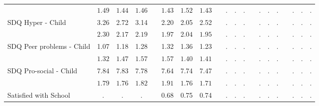 \begin{center}
{\begin{longtable}{L{5cm} c c c p{.5cm} c c c p{.5cm} c c c p{.5cm} c c c p{.5cm} c c c}
& $\mathit{     1.49}$ & $\mathit{     1.44}$ & $\mathit{     1.46}$ & & $\mathit{     1.43}$ & $\mathit{     1.52}$ & $\mathit{     1.43}$ & & $\mathit{        .}$ & $\mathit{        .}$ & $\mathit{        .}$ & & $\mathit{        .}$ & $\mathit{        .}$ & $\mathit{        .}$ & & $\mathit{        .}$ & $\mathit{        .}$ & $\mathit{        .}$ \\[.7em]
SDQ Hyper - Child & 3.26 &      2.72 &      3.14 & &      2.20 &      2.05 &      2.52 & &         . &         . &         . & &         . &         . &         . & &         . &         . &         . \\*
& $\mathit{     2.30}$ & $\mathit{     2.17}$ & $\mathit{     2.19}$ & & $\mathit{     1.97}$ & $\mathit{     2.04}$ & $\mathit{     1.95}$ & & $\mathit{        .}$ & $\mathit{        .}$ & $\mathit{        .}$ & & $\mathit{        .}$ & $\mathit{        .}$ & $\mathit{        .}$ & & $\mathit{        .}$ & $\mathit{        .}$ & $\mathit{        .}$ \\[.7em]
SDQ Peer problems - Child & 1.07 &      1.18 &      1.28 & &      1.32 &      1.36 &      1.23 & &         . &         . &         . & &         . &         . &         . & &         . &         . &         . \\*
& $\mathit{     1.32}$ & $\mathit{     1.47}$ & $\mathit{     1.57}$ & & $\mathit{     1.57}$ & $\mathit{     1.40}$ & $\mathit{     1.41}$ & & $\mathit{        .}$ & $\mathit{        .}$ & $\mathit{        .}$ & & $\mathit{        .}$ & $\mathit{        .}$ & $\mathit{        .}$ & & $\mathit{        .}$ & $\mathit{        .}$ & $\mathit{        .}$ \\[.7em]
SDQ Pro-social - Child & 7.84 &      7.83 &      7.78 & &      7.64 &      7.74 &      7.47 & &         . &         . &         . & &         . &         . &         . & &         . &         . &         . \\*
& $\mathit{     1.79}$ & $\mathit{     1.76}$ & $\mathit{     1.82}$ & & $\mathit{     1.91}$ & $\mathit{     1.76}$ & $\mathit{     1.71}$ & & $\mathit{        .}$ & $\mathit{        .}$ & $\mathit{        .}$ & & $\mathit{        .}$ & $\mathit{        .}$ & $\mathit{        .}$ & & $\mathit{        .}$ & $\mathit{        .}$ & $\mathit{        .}$ \\[.7em]
Satisfied with School & . &         . &         . & &      0.68 &      0.75 &      0.74 & &         . &         . &         . & &         . &         . &         . & &         . &         . &         . \\*

\end{longtable}}
\end{center}
